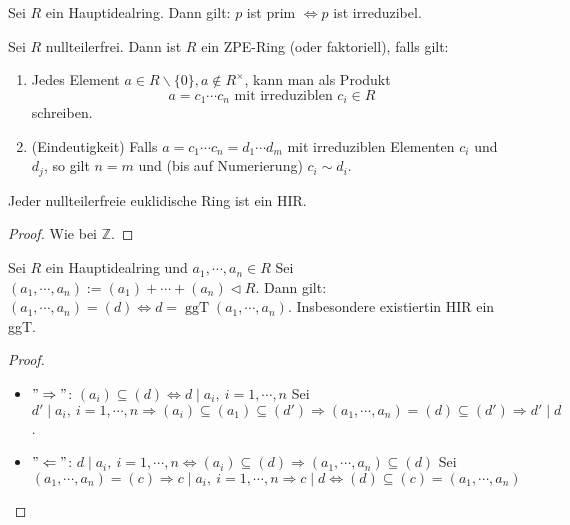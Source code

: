 \begin{theorem}
    Sei $R$ ein Hauptidealring. Dann gilt:
    $p$ ist prim $\Longleftrightarrow p$ ist irreduzibel.
\end{theorem}

\begin{definition}
    Sei $R$ nullteilerfrei. Dann ist $R$ ein ZPE-Ring (oder faktoriell), falls gilt:
    \begin{enumerate}
        \item Jedes Element $a \in R \backslash\{0\}, a \notin R^{\times}$, kann man als Produkt
        $$
        a=c_{1} \cdots c_{n} \text { mit irreduziblen } c_{i} \in R
        $$
        schreiben.
        \item (Eindeutigkeit) Falls $a=c_{1} \cdots c_{n}=d_{1} \cdots d_{m}$ mit irreduziblen Elementen $c_{i}$ und $d_{j}$, so gilt $n=m$ und (bis auf Numerierung) $c_{i} \sim d_{i}$.
    \end{enumerate}
\end{definition}

\begin{theorem}
    Jeder nullteilerfreie euklidische Ring ist ein HIR.
\end{theorem}
\begin{proof}
    Wie bei \(\mathbb{Z}\).
\end{proof}
\begin{lemma}
    Sei $R$ ein Hauptidealring und \(a_1,\cdots,a_n\in R\) Sei \((a_1,\cdots,a_n):= (a_1)+\cdots+(a_n)\triangleleft R\). Dann gilt: \((a_1,\cdots,a_n)=(d)\Leftrightarrow d = \operatorname{ggT}(a_1,\cdots , a_n)\). Insbesondere existiertin HIR ein ggT.
\end{lemma}
\begin{proof}
    \begin{itemize}
        \item \("\Rightarrow"\): \((a_i)\subseteq (d)\Leftrightarrow d\mid a_i,\ i = 1,\cdots ,n\) Sei \(d'\mid a_i, \ i=1,\cdots,n\Rightarrow (a_i)\subseteq (a_1)\subseteq (d')\Rightarrow (a_1,\cdots,a_n)=(d)\subseteq (d')\Rightarrow d' \mid d\).
        \item \("\Leftarrow"\): \(d\mid a_i, \ i=1,\cdots,n\Leftrightarrow (a_i)\subseteq (d)\Rightarrow (a_1,\cdots,a_n)\subseteq (d)\) Sei \((a_1,\cdots,a_n)=(c)\Rightarrow c\mid a_i,\ i =1,\cdots,n\Rightarrow c\mid d \Leftrightarrow (d)\subseteq (c) = (a_1,\cdots , a_n)\)
    \end{itemize}
\end{proof}

